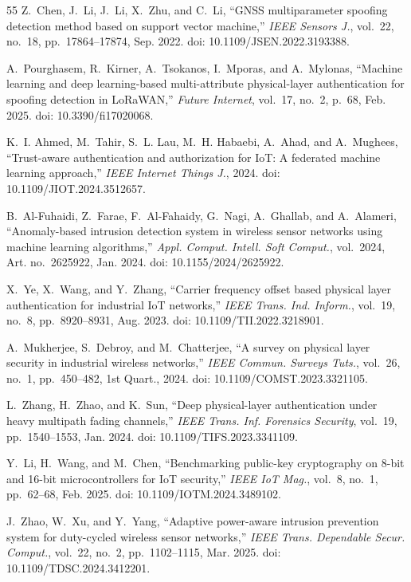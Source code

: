 \documentclass[conference]{IEEEtran}
\begin{document}
\begin{thebibliography}{55}
Z.~Chen, J.~Li, J.~Li, X.~Zhu, and C.~Li, ``GNSS multiparameter spoofing detection method based on support vector machine,'' \textit{IEEE Sensors J.}, vol.~22, no.~18, pp.~17864--17874, Sep. 2022. doi: 10.1109/JSEN.2022.3193388.

A.~Pourghasem, R.~Kirner, A.~Tsokanos, I.~Mporas, and A.~Mylonas, ``Machine learning and deep learning-based multi-attribute physical-layer authentication for spoofing detection in LoRaWAN,'' \textit{Future Internet}, vol.~17, no.~2, p.~68, Feb. 2025. doi: 10.3390/fi17020068.

K.~I. Ahmed, M.~Tahir, S.~L. Lau, M.~H. Habaebi, A.~Ahad, and A.~Mughees, ``Trust-aware authentication and authorization for IoT: A federated machine learning approach,'' \textit{IEEE Internet Things J.}, 2024. doi: 10.1109/JIOT.2024.3512657.

B.~Al-Fuhaidi, Z.~Farae, F.~Al-Fahaidy, G.~Nagi, A.~Ghallab, and A.~Alameri, ``Anomaly-based intrusion detection system in wireless sensor networks using machine learning algorithms,'' \textit{Appl. Comput. Intell. Soft Comput.}, vol.~2024, Art. no.~2625922, Jan. 2024. doi: 10.1155/2024/2625922.

X.~Ye, X.~Wang, and Y.~Zhang, ``Carrier frequency offset based physical layer authentication for industrial IoT networks,'' \textit{IEEE Trans. Ind. Inform.}, vol.~19, no.~8, pp.~8920--8931, Aug. 2023. doi: 10.1109/TII.2022.3218901.

A.~Mukherjee, S.~Debroy, and M.~Chatterjee, ``A survey on physical layer security in industrial wireless networks,'' \textit{IEEE Commun. Surveys Tuts.}, vol.~26, no.~1, pp.~450--482, 1st Quart., 2024. doi: 10.1109/COMST.2023.3321105.

L.~Zhang, H.~Zhao, and K.~Sun, ``Deep physical-layer authentication under heavy multipath fading channels,'' \textit{IEEE Trans. Inf. Forensics Security}, vol.~19, pp.~1540--1553, Jan. 2024. doi: 10.1109/TIFS.2023.3341109.

Y.~Li, H.~Wang, and M.~Chen, ``Benchmarking public-key cryptography on 8-bit and 16-bit microcontrollers for IoT security,'' \textit{IEEE IoT Mag.}, vol.~8, no.~1, pp.~62--68, Feb. 2025. doi: 10.1109/IOTM.2024.3489102.

J.~Zhao, W.~Xu, and Y.~Yang, ``Adaptive power-aware intrusion prevention system for duty-cycled wireless sensor networks,'' \textit{IEEE Trans. Dependable Secur. Comput.}, vol.~22, no.~2, pp.~1102--1115, Mar. 2025. doi: 10.1109/TDSC.2024.3412201.


\end{thebibliography}
\end{document}
